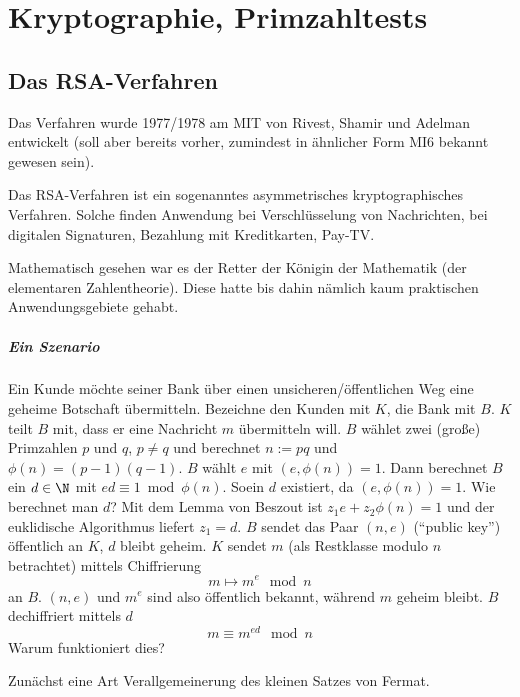 \chapter{Kryptographie, Primzahltests}



\section{Das RSA-Verfahren}

Das Verfahren wurde 1977/1978 am MIT von Rivest, Shamir und Adelman entwickelt (soll aber bereits vorher, zumindest in ähnlicher Form MI6 bekannt gewesen sein).

Das RSA-Verfahren ist ein sogenanntes asymmetrisches kryptographisches Verfahren.
Solche finden Anwendung bei Verschlüsselung von Nachrichten, bei digitalen Signaturen, Bezahlung mit Kreditkarten, Pay-TV.

Mathematisch gesehen war es der Retter der Königin der Mathematik (der elementaren Zahlentheorie).
Diese hatte bis dahin nämlich kaum praktischen Anwendungsgebiete gehabt.


\paragraph{Ein Szenario}
Ein Kunde möchte seiner Bank über einen unsicheren/öffentlichen Weg eine geheime Botschaft übermitteln.
Bezeichne den Kunden mit $K$, die Bank mit $B$.
$K$ teilt $B$ mit, dass er eine Nachricht $m$ übermitteln will.
$B$ wählet zwei (große) Primzahlen $p$ und $q$, $p \neq q$ und berechnet $n := pq$ und $\phi(n) = (p-1)(q-1)$.
$B$ wählt $e$ mit $(e, \phi(n)) = 1$.
Dann berechnet $B$ ein $d \in \N$ mit $ed \equiv 1 \bmod \phi(n)$.
Soein $d$ existiert, da $(e, \phi(n)) = 1$.
Wie berechnet man $d$?
Mit dem Lemma von Beszout ist $z_1 e + z_2 \phi(n) = 1$ und der euklidische Algorithmus liefert $z_1 = d$.
$B$ sendet das Paar $(n, e)$ (“public key”) öffentlich an $K$, $d$ bleibt geheim.
$K$ sendet $m$ (als Restklasse modulo $n$ betrachtet) mittels Chiffrierung
\[
	m \mapsto m^e \mod n
\]
an $B$.
$(n, e)$ und $m^e$ sind also öffentlich bekannt, während $m$ geheim bleibt.
$B$ dechiffriert mittels $d$
\[
	m \equiv m^{ed} \mod n
\]
Warum funktioniert dies?


Zunächst eine Art Verallgemeinerung des kleinen Satzes von Fermat.

